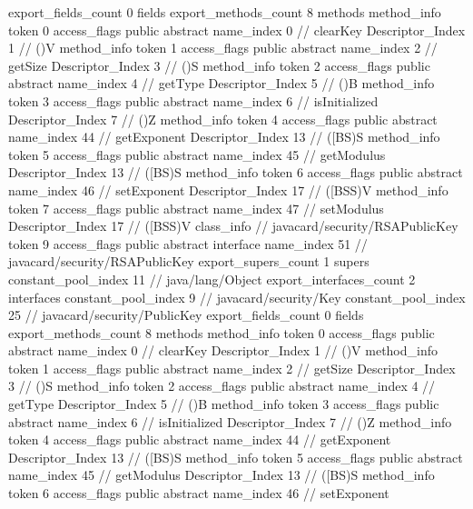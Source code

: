 {{{{			}
			export_fields_count	0
			fields {
			}
			export_methods_count	8
			methods {
				method_info {
					token	0
					access_flags	public abstract
					name_index	0		// clearKey
					Descriptor_Index	1		// ()V
				}
				method_info {
					token	1
					access_flags	public abstract
					name_index	2		// getSize
					Descriptor_Index	3		// ()S
				}
				method_info {
					token	2
					access_flags	public abstract
					name_index	4		// getType
					Descriptor_Index	5		// ()B
				}
				method_info {
					token	3
					access_flags	public abstract
					name_index	6		// isInitialized
					Descriptor_Index	7		// ()Z
				}
				method_info {
					token	4
					access_flags	public abstract
					name_index	44		// getExponent
					Descriptor_Index	13		// ([BS)S
				}
				method_info {
					token	5
					access_flags	public abstract
					name_index	45		// getModulus
					Descriptor_Index	13		// ([BS)S
				}
				method_info {
					token	6
					access_flags	public abstract
					name_index	46		// setExponent
					Descriptor_Index	17		// ([BSS)V
				}
				method_info {
					token	7
					access_flags	public abstract
					name_index	47		// setModulus
					Descriptor_Index	17		// ([BSS)V
				}
			}
		}
		class_info {		// javacard/security/RSAPublicKey
			token	9
			access_flags	public abstract interface
			name_index	51		// javacard/security/RSAPublicKey
			export_supers_count	1
			supers {
				constant_pool_index	11		// java/lang/Object
			}
			export_interfaces_count	2
			interfaces {
				constant_pool_index	9		// javacard/security/Key
				constant_pool_index	25		// javacard/security/PublicKey
			}
			export_fields_count	0
			fields {
			}
			export_methods_count	8
			methods {
				method_info {
					token	0
					access_flags	public abstract
					name_index	0		// clearKey
					Descriptor_Index	1		// ()V
				}
				method_info {
					token	1
					access_flags	public abstract
					name_index	2		// getSize
					Descriptor_Index	3		// ()S
				}
				method_info {
					token	2
					access_flags	public abstract
					name_index	4		// getType
					Descriptor_Index	5		// ()B
				}
				method_info {
					token	3
					access_flags	public abstract
					name_index	6		// isInitialized
					Descriptor_Index	7		// ()Z
				}
				method_info {
					token	4
					access_flags	public abstract
					name_index	44		// getExponent
					Descriptor_Index	13		// ([BS)S
				}
				method_info {
					token	5
					access_flags	public abstract
					name_index	45		// getModulus
					Descriptor_Index	13		// ([BS)S
				}
				method_info {
					token	6
					access_flags	public abstract
					name_index	46		// setExponent
}}}}}
